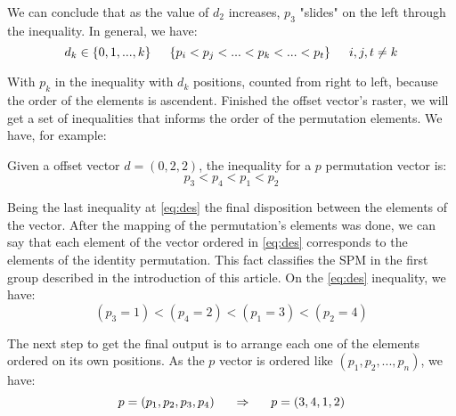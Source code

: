 \documentclass {amsart}
\begin{document}
We can conclude that as the value of {$d_2$} increases, {$p_3$}
"slides" on the left through the inequality. In general, we have:
\begin{equation}
d_k \in \{0, 1, ..., k\} \indent \{p_i < p_j < ... < p_k < ... <
p_t\} \indent i, j, t \neq k
\end{equation}

With {$p_k$} in the inequality with {$d_k$} positions, counted
from right to left, because the order of the elements is
ascendent. Finished the offset vector's raster, we will get a set
of inequalities that informs the order of the permutation
elements. We have, for example:

Given a offset vector {$d = (0,2,2)$}, the inequality for a {$p$}
permutation vector is:
\begin{equation} \label{eq:des}
p_3 < p_4 < p_1 < p_2
\end{equation}

Being the last inequality at \ref{eq:des} the final disposition
between the elements of the vector. After the mapping of the
permutation's elements was done, we can say that each element of
the vector ordered in \ref{eq:des} corresponds to the elements of
the identity permutation. This fact classifies the SPM in the
first group described in the introduction of this article. On the
\ref{eq:des} inequality, we have:
\begin{equation}
(p_3 = 1) < (p_4 = 2) < (p_1 = 3) < (p_2 = 4)
\end{equation}

The next step to get the final output is to arrange each one of
the elements ordered on its own positions. As the {$p$} vector is
ordered like {$(p_1, p_2, ..., p_n)$}, we have:
\begin{equation}
 p = (p_1, p_2, p_3, p_4)  \indent \Rightarrow \indent p = (3, 4, 1, 2)
\end{equation}
\end{document}
